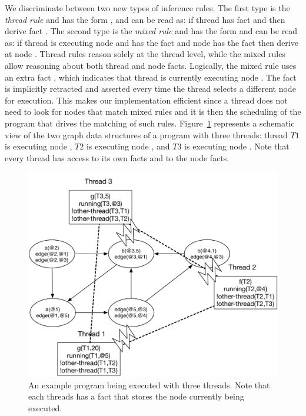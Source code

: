 We discriminate between two new types of inference rules. The first type is the
\emph{thread rule} and has the form , and can be read
as: if thread  has fact  and  then derive fact
. The second type is the \emph{mixed rule} and has the form
 and can be read as: if thread  is executing
node  and has the fact  and node  has the fact
 then derive  at node . Thread rules reason
solely at the thread level, while the mixed rules allow reasoning about both
thread and node facts. Logically, the mixed rule uses an extra fact
, which indicates that thread  is currently
executing node . The  fact is implicitly retracted and
asserted every time the thread selects a different node for execution. This
makes our implementation efficient since a thread does not need to look for
nodes that match mixed rules and it is then the scheduling of the program that
drives the matching of such rules. Figure~\ref{fig:coord:thread_facts}
represents a schematic view of the two graph data structures of a program with
three threads: thread $T1$ is executing node , $T2$ is executing node
, and $T3$ is executing node . Note that every thread has
access to its own facts and to the node facts.

\begin{figure}[ht]
   \includegraphics[width=0.6\linewidth]{figures/threads/threads.pdf}

   \caption{An example program being executed with three threads. Note that each
      threads has a  fact that stores the node currently being
   executed.}

   \label{fig:coord:thread_facts}
\end{figure}

